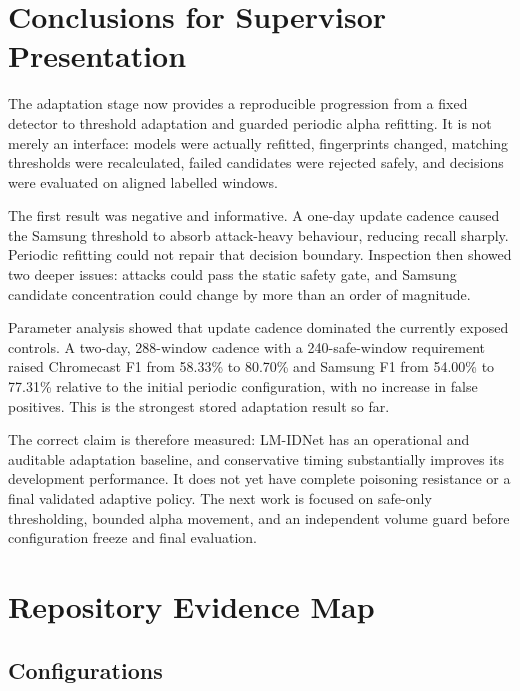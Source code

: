 \documentclass[11pt,a4paper]{article}
\newcommand{\projectname}{LM-IDNet}
\begin{document}
\section{Conclusions for Supervisor Presentation}

The adaptation stage now provides a reproducible progression from a fixed
detector to threshold adaptation and guarded periodic alpha refitting. It is
not merely an interface: models were actually refitted, fingerprints changed,
matching thresholds were recalculated, failed candidates were rejected safely,
and decisions were evaluated on aligned labelled windows.

The first result was negative and informative. A one-day update cadence caused
the Samsung threshold to absorb attack-heavy behaviour, reducing recall
sharply. Periodic refitting could not repair that decision boundary. Inspection
then showed two deeper issues: attacks could pass the static safety gate, and
Samsung candidate concentration could change by more than an order of
magnitude.

Parameter analysis showed that update cadence dominated the currently exposed
controls. A two-day, 288-window cadence with a 240-safe-window requirement
raised Chromecast F1 from 58.33\% to 80.70\% and Samsung F1 from 54.00\% to
77.31\% relative to the initial periodic configuration, with no increase in
false positives. This is the strongest stored adaptation result so far.

The correct claim is therefore measured: \projectname{} has an operational and
auditable adaptation baseline, and conservative timing substantially improves
its development performance. It does not yet have complete poisoning
resistance or a final validated adaptive policy. The next work is focused on
safe-only thresholding, bounded alpha movement, and an independent volume
guard before configuration freeze and final evaluation.

\appendix

\section{Repository Evidence Map}

\subsection{Configurations}
\end{document}

